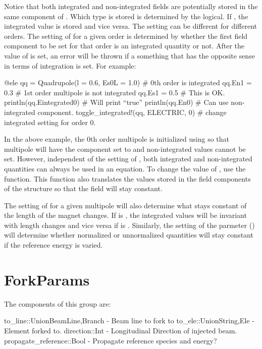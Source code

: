 Notice that both integrated
and non-integrated fields are potentially stored in the same component of .
Which type is stored is determined by the  logical. If , the integrated
value is stored and vice versa. The  setting can be different for different orders.
The setting of  for a given order is determined by whether the first field component
to be set for that order is an integrated quantity or not. After the value of  is set,
an error will be thrown if a something that has the opposite sense in terms of integration is 
set. For example:
\begin{example}
  @ele qq = Quadrupole(l = 0.6, Es0L = 1.0)  # 0th order is integrated
  qq.En1 = 0.3                  # 1st order multipole is not integrated
  qq.Es1 = 0.5                  # This is OK.
  println(qq.Eintegrated0)      # Will print ``true''
  println(qq.En0)               # Can use non-integrated component.
  toggle_integrated!(qq, ELECTRIC, 0)  # change integrated setting for order 0.
\end{example}
In the above example, the 0th order multipole is initialized using  so that
multipole will have the  component set to  and non-integrated values
cannot be set. However, independent of the setting of , both integrated and
non-integrated quantities can always be used in an equation. To change the value of ,
use the  function. This function also translates the values stored in the
field components of the structure so that the field will stay constant.

The setting of  for a given multipole will also determine what stays constant
of the length of the magnet changes. If  is , the integrated values
will be invariant with length changes and vice versa if  is . 
Similarly, the setting of the  parmeter () will determine 
whether normalized or unnormalized quantities will stay constant if the reference energy is varied.

\section{ForkParams}
\label{s:fork.g}

The components of this group are:
\begin{example}
  to_line::Union{BeamLine,Branch}   - Beam line to fork to
  to_ele::Union{String,Ele}         - Element forked to.
  direction::Int                    - Longitudinal Direction of injected beam.
  propagate_reference::Bool         - Propagate reference species and energy?
\end{example}

